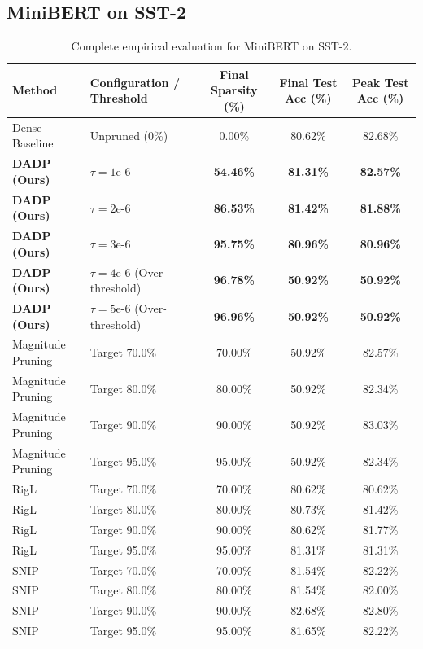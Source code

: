 \subsection{MiniBERT on SST-2}

\begin{table}[H]
\caption{Complete empirical evaluation for MiniBERT on SST-2.}
\label{tab:app_bert_sst2}
\centering
\small
\begin{tabular}{llccc}
\toprule
\textbf{Method} & \textbf{Configuration / Threshold} & \textbf{Final Sparsity (\%)} & \textbf{Final Test Acc (\%)} & \textbf{Peak Test Acc (\%)} \\
\midrule
Dense Baseline & Unpruned (0\%) & 0.00\% & 80.62\% & 82.68\% \\
\textbf{DADP (Ours)} & $\tau = 1\text{e-}6$ & \textbf{54.46\%} & \textbf{81.31\%} & \textbf{82.57\%} \\
\textbf{DADP (Ours)} & $\tau = 2\text{e-}6$ & \textbf{86.53\%} & \textbf{81.42\%} & \textbf{81.88\%} \\
\textbf{DADP (Ours)} & $\tau = 3\text{e-}6$ & \textbf{95.75\%} & \textbf{80.96\%} & \textbf{80.96\%} \\
\textbf{DADP (Ours)} & $\tau = 4\text{e-}6$ (Over-threshold) & \textbf{96.78\%} & \textbf{50.92\%} & \textbf{50.92\%} \\
\textbf{DADP (Ours)} & $\tau = 5\text{e-}6$ (Over-threshold) & \textbf{96.96\%} & \textbf{50.92\%} & \textbf{50.92\%} \\
\midrule
Magnitude Pruning & Target 70.0\% & 70.00\% & 50.92\% & 82.57\% \\
Magnitude Pruning & Target 80.0\% & 80.00\% & 50.92\% & 82.34\% \\
Magnitude Pruning & Target 90.0\% & 90.00\% & 50.92\% & 83.03\% \\
Magnitude Pruning & Target 95.0\% & 95.00\% & 50.92\% & 82.34\% \\
\midrule
RigL & Target 70.0\% & 70.00\% & 80.62\% & 80.62\% \\
RigL & Target 80.0\% & 80.00\% & 80.73\% & 81.42\% \\
RigL & Target 90.0\% & 90.00\% & 80.62\% & 81.77\% \\
RigL & Target 95.0\% & 95.00\% & 81.31\% & 81.31\% \\
\midrule
SNIP & Target 70.0\% & 70.00\% & 81.54\% & 82.22\% \\
SNIP & Target 80.0\% & 80.00\% & 81.54\% & 82.00\% \\
SNIP & Target 90.0\% & 90.00\% & 82.68\% & 82.80\% \\
SNIP & Target 95.0\% & 95.00\% & 81.65\% & 82.22\% \\
\bottomrule
\end{tabular}
\end{table}

